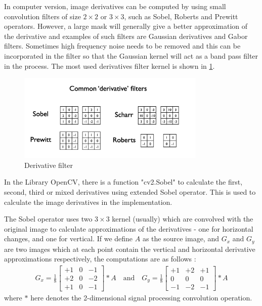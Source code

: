 In computer version, image derivatives can be computed by using small convolution filters of size $2 \times 2$ or $3 \times 3$, such as Sobel, Roberts and Prewitt operators. However, a large mask will generally give a better approximation of the derivative and examples of such filters are Gaussian derivatives and Gabor filters. Sometimes high frequency noise needs to be removed and this can be incorporated in the filter so that the Gaussian kernel will act as a band pass filter in the process. The most used derivatives filter kernel is shown in \cref{fig:Derivative Filter}.
\begin{figure}[htbp]
	\centering
	\includegraphics[width=0.80\textwidth]{images/derivatives}
	\caption{Derivative filter}
	\label{fig:Derivative Filter}
\end{figure}

In the Library OpenCV, there is a function "cv2.Sobel" to calculate the first, second, third or mixed derivatives using extended Sobel operator. This is used to calculate the image derivatives in the implementation. 

The Sobel operator uses two $3\times3$ kernel (usually) which are convolved with the original image to calculate approximations of the derivatives - one for horizontal changes, and one for vertical. If we define $A$ as the source image, and $G_x$ and $G_y$ are two images which at each point contain the vertical and horizontal derivative approximations respectively, the computations are as follows \cite{SobelOperator2020}:
\begin{align}
	G_x = \frac{1}{8}\begin{bmatrix} 
		+1 & 0 & -1  \\
		+2 & 0 & -2 \\
		+1 & 0 & -1 
	\end{bmatrix} * A
	\quad
	\mbox{and}
	\quad   
	G_y = \frac{1}{8}\begin{bmatrix} 
		+1 & +2 & +1\\
		0 & 0 & 0 \\
		-1 & -2 & -1
	\end{bmatrix} * A
\end{align}
where $*$ here denotes the 2-dimensional signal processing convolution operation.

